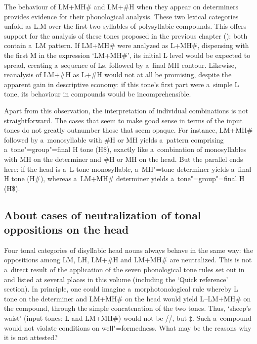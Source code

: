 The behaviour of LM+MH\# and LM+\#H when they appear on determiners provides evidence for their
phonological analysis. These two
lexical categories unfold as L.M over the first two syllables of polysyllabic
compounds. This offers support for the analysis of these tones proposed in the previous chapter (): both contain a~LM pattern. If LM+MH\# were analyzed as L+MH\#, dispensing with the first M in the expression ‘LM+MH\#’, its initial L level would be
expected to spread, creating a~sequence of Ls, followed by a~final MH contour. Likewise, reanalysis of LM+\#H as L+\#H would not at all be promising, despite the apparent gain in descriptive economy: if this tone's first part were a~simple L tone, its behaviour in compounds would be incomprehensible.

Apart from this observation, the interpretation of individual combinations is not
straightforward. The cases that seem to make good sense in terms of the input tones do not greatly
outnumber those that seem opaque. For instance, LM+MH\# followed by a~{monosyllable} with \#H or MH
yields a~pattern comprising a~tone"=group"=final H tone (H\$), exactly like a~combination of
monosyllables with MH on the determiner and \#H or MH on the head. But the parallel ends here: if
the head is a~L-tone {monosyllable}, a~MH"=tone determiner yields a~final H tone (H\#), whereas
a~LM+MH\# determiner yields a~tone"=group"=final H (H\$).


\subsection[Cases of neutralization of tonal oppositions on the head]{About cases of neutralization of tonal oppositions on the head}
\label{sec:abouttheneutralizationoftonaloppositionsonthehead}

Four tonal categories of disyllabic head nouns always behave in the same way: the oppositions among
LM, LH, LM+\#H and LM+MH\# are neutralized. This  is not a~direct result of the application of
the seven phonological tone rules set out in  and listed at several places in this volume (including the ‘Quick reference’ section). In
principle, one could imagine a~morphotonological rule whereby L tone on the determiner and LM+MH\#
on the head would yield L--LM+MH\# on the compound, through the simple concatenation of the
two tones. Thus, ‘sheep’s waist’ (input tones: L and LM+MH\#) would not be //, but $\ddagger${\kern2pt}. Such a~compound would not violate conditions on well"=formedness. What may be the reasons why it is not attested? 

